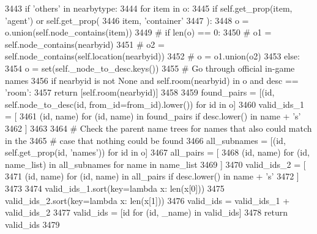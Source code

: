 \begin{DoxyCode}
3443                 \textcolor{keywordflow}{if} \textcolor{stringliteral}{'others'} \textcolor{keywordflow}{in} nearbytype:
3444                     \textcolor{keywordflow}{for} item \textcolor{keywordflow}{in} o:
3445                         \textcolor{keywordflow}{if} self.get\_prop(item, \textcolor{stringliteral}{'agent'}) \textcolor{keywordflow}{or} self.get\_prop(
3446                             item, \textcolor{stringliteral}{'container'}
3447                         ):
3448                             o = o.union(self.node\_contains(item))
3449                 \textcolor{comment}{# if len(o) == 0:}
3450                 \textcolor{comment}{#     o1 = self.node\_contains(nearbyid)}
3451                 \textcolor{comment}{#     o2 = self.node\_contains(self.location(nearbyid))}
3452                 \textcolor{comment}{#     o = o1.union(o2)}
3453         \textcolor{keywordflow}{else}:
3454             o = set(self.\_node\_to\_desc.keys())
3455         \textcolor{comment}{# Go through official in-game names}
3456         \textcolor{keywordflow}{if} nearbyid \textcolor{keywordflow}{is} \textcolor{keywordflow}{not} \textcolor{keywordtype}{None} \textcolor{keywordflow}{and} self.room(nearbyid) \textcolor{keywordflow}{in} o \textcolor{keywordflow}{and} desc == \textcolor{stringliteral}{'room'}:
3457             \textcolor{keywordflow}{return} [self.room(nearbyid)]
3458 
3459         found\_pairs = [(id, self.node\_to\_desc(id, from\_id=from\_id).lower()) \textcolor{keywordflow}{for} id \textcolor{keywordflow}{in} o]
3460         valid\_ids\_1 = [
3461             (id, name) \textcolor{keywordflow}{for} (id, name) \textcolor{keywordflow}{in} found\_pairs \textcolor{keywordflow}{if} desc.lower() \textcolor{keywordflow}{in} name + \textcolor{stringliteral}{'s'}
3462         ]
3463 
3464         \textcolor{comment}{# Check the parent name trees for names that also could match in the}
3465         \textcolor{comment}{# case that nothing could be found}
3466         all\_subnames = [(id, self.get\_prop(id, \textcolor{stringliteral}{'names'})) \textcolor{keywordflow}{for} id \textcolor{keywordflow}{in} o]
3467         all\_pairs = [
3468             (id, name) \textcolor{keywordflow}{for} (id, name\_list) \textcolor{keywordflow}{in} all\_subnames \textcolor{keywordflow}{for} name \textcolor{keywordflow}{in} name\_list
3469         ]
3470         valid\_ids\_2 = [
3471             (id, name) \textcolor{keywordflow}{for} (id, name) \textcolor{keywordflow}{in} all\_pairs \textcolor{keywordflow}{if} desc.lower() \textcolor{keywordflow}{in} name + \textcolor{stringliteral}{'s'}
3472         ]
3473 
3474         valid\_ids\_1.sort(key=\textcolor{keyword}{lambda} x: len(x[0]))
3475         valid\_ids\_2.sort(key=\textcolor{keyword}{lambda} x: len(x[1]))
3476         valid\_ids = valid\_ids\_1 + valid\_ids\_2
3477         valid\_ids = [id \textcolor{keywordflow}{for} (id, \_name) \textcolor{keywordflow}{in} valid\_ids]
3478         \textcolor{keywordflow}{return} valid\_ids
3479 
\end{DoxyCode}
